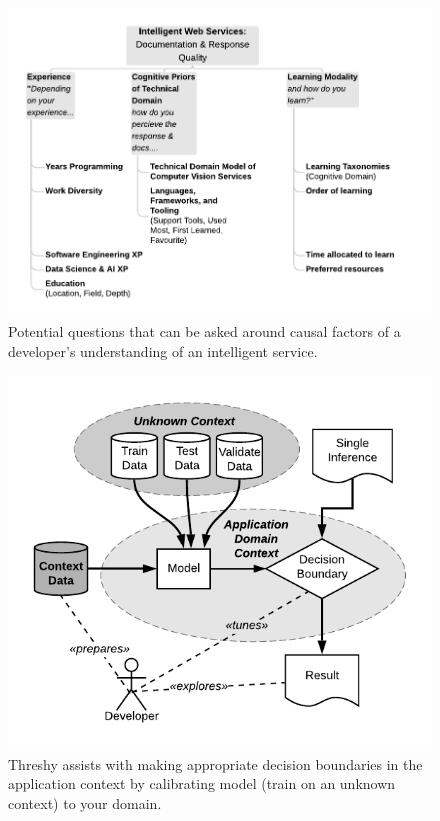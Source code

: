 \begin{figure}[p!]
\centering
\caption[Potential questions that can be asked around causal factors of a developer's understanding of an intelligent service]{Potential questions that can be asked around causal factors of a developer's understanding of an intelligent service.}
\label{fig:additional:tdm-questions}
\includegraphics[width=\linewidth]{appendix/figures/tdm-questions}
\end{figure}

\begin{figure}[p!]
\centering
\caption[Threshy and developer interaction with decision boundaries]{Threshy assists with making appropriate decision boundaries in the application context by calibrating model (train on an unknown context) to your domain.}
\label{fig:additional:threshy-decision-boundary}
\includegraphics[width=.8\linewidth]{appendix/figures/threshy-decision-boundary}
\end{figure}

